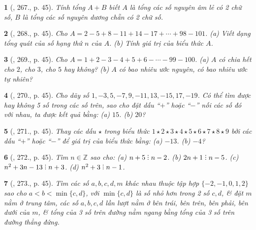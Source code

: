 \documentclass{article}
\newtheorem{baitoan}{}
\DeclareRobustCommand{\divby}{%
	\mathrel{\vbox{\baselineskip.65ex\lineskiplimit0pt\hbox{.}\hbox{.}\hbox{.}}}%
}
\begin{document}
\begin{baitoan}[\cite{Binh_Toan_6_tap_1}, 267., p. 45]
	Tính tổng $A + B$ biết $A$ là tổng các số nguyên âm lẻ có 2 chữ số, $B$ là tổng các số nguyên dương chẵn có 2 chữ số.
\end{baitoan}

\begin{baitoan}[\cite{Binh_Toan_6_tap_1}, 268., p. 45]
	Cho $A = 2 - 5 + 8 - 11 + 14 - 17 + \cdots + 98 - 101$. (a) Viết dạng tổng quát của số hạng thứ $n$ của $A$. (b) Tính giá trị của biểu thức $A$.
\end{baitoan}

\begin{baitoan}[\cite{Binh_Toan_6_tap_1}, 269., p. 45]
	Cho $A = 1 + 2 - 3 - 4 + 5 + 6 - \cdots - 99 - 100$. (a) $A$ có chia hết cho $2$, cho $3$, cho $5$ hay không? (b) $A$ có bao nhiêu ước nguyên, có bao nhiêu ước tự nhiên?
\end{baitoan}

\begin{baitoan}[\cite{Binh_Toan_6_tap_1}, 270., p. 45]
	Cho dãy số $1,-3,5,-7,9,-11,13,-15,17,-19$. Có thể tìm được hay không 5 số trong các số trên, sao cho đặt dấu ``$+$'' hoặc ``$-$'' nối các số đó với nhau, ta được kết quả bằng: (a) $15$. (b) $20$?
\end{baitoan}

\begin{baitoan}[\cite{Binh_Toan_6_tap_1}, 271., p. 45]
	Thay các dấu  $\star$ trong biểu thức $1\star2\star3\star4\star5\star6\star7\star8\star9$ bởi các dấu ``$+$'' hoặc ``$-$'' để giá trị của biểu thức bằng: (a) $-13$. (b) $-4$?
\end{baitoan}

\begin{baitoan}[\cite{Binh_Toan_6_tap_1}, 272., p. 45]
	Tìm $n\in\mathbb{Z}$ sao cho: (a) $n + 5\divby n - 2$. (b) $2n + 1\divby n - 5$. (c) $n^2 + 3n - 13\divby n + 3$. (d) $n^2 + 3\divby n - 1$.
\end{baitoan}

\begin{baitoan}[\cite{Binh_Toan_6_tap_1}, 273., p. 45]
	Tìm các số $a,b,c,d,m$ khác nhau thuộc tập hợp $\{-2,-1,0,1,2\}$ sao cho $a < b < \min\{c,d\}$, với $\min\{c,d\}$ là số nhỏ hơn trong 2 số $c,d$, \& đặt $m$ nằm ở trung tâm, các số $a,b,c,d$ lần lượt nằm ở bên trái, bên trên, bên phải, bên dưới của $m$, \& tổng của 3 số trên đường nằm ngang bằng tổng của 3 số trên đường thẳng đứng.
\end{baitoan}
\end{document}
